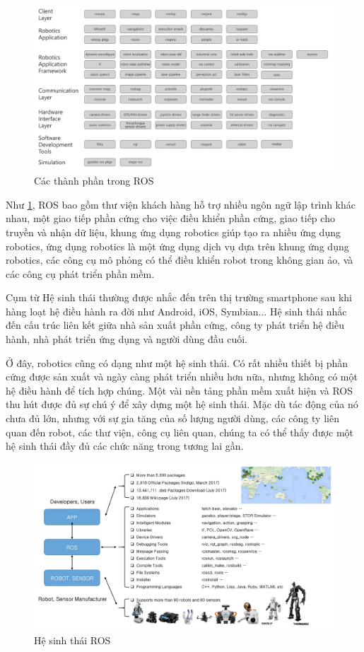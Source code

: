 \begin{figure}[htp]
	\centering
	\includegraphics[width=1\linewidth]{chapter2/figs/components.pdf}
	\caption{Các thành phần trong ROS}
	\label{fig:components}
\end{figure}

Như \figurename{\ref{fig:components}}, ROS bao gồm thư viện khách hàng hỗ trợ nhiều ngôn ngữ lập trình khác nhau, một giao tiếp phần cứng cho việc điều khiển phần cứng, giao tiếp cho truyền và nhận dữ liệu, khung ứng dụng robotics giúp tạo ra nhiều ứng dụng robotics, ứng dụng robotics là một ứng dụng dịch vụ dựa trên khung ứng dụng robotics, các công cụ mô phỏng có thể điều khiển robot trong không gian ảo, và các công cụ phát triển phần mềm. 

Cụm từ Hệ sinh thái thường được nhắc đến trên thị trường smartphone sau khi hàng loạt hệ điều hành ra đời như Android, iOS, Symbian... Hệ sinh thái nhắc đến cấu trúc liên kết giữa nhà sản xuất phần cứng, công ty phát triển hệ điều hành, nhà phát triển ứng dụng và người dùng đầu cuối.

Ở đây, robotics cũng có dạng như một hệ sinh thái. Có rất nhiều thiết bị phần cứng được sản xuất và ngày càng phát triển nhiều hơn nữa, nhưng không có một hệ điều hành để tích hợp chúng. Một vài nền tảng phần mềm xuất hiện và ROS thu hút được đủ sự chú ý để xây dựng một hệ sinh thái. Mặc dù tác động của nó chưa đủ lớn, nhưng với sự gia tăng của số lượng người dùng, các công ty liên quan đến robot, các thư viện, công cụ liên quan, chúng ta có thể thấy được một hệ sinh thái đầy đủ các chức năng trong tương lai gần. 
\begin{figure}[htp]
	\centering
	\includegraphics[width=1\linewidth]{chapter2/figs/Ecosystem.pdf}
	\caption{Hệ sinh thái ROS}
	\label{fig:Ecosystem}
\end{figure}
